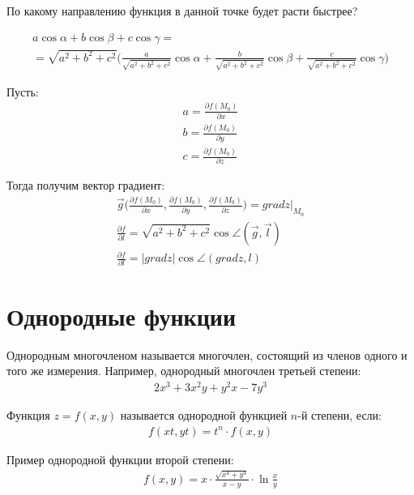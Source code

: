 \documentclass[a4paper,12pt,oneside]{extbook}
\theoremstyle{numbered}
\theoremstyle{unnumbered}
\theoremstyle{named}
\theoremstyle{unnumbered}
\theoremstyle{named}
\theoremstyle{named}
\theoremstyle{named}
\begin{document}
По какому направлению функция в данной точке будет расти быстрее?

\begin{gather*}
    a\cos{\alpha} + b\cos{\beta} + c\cos{\gamma} = \\
    = \sqrt{a^2 + b^2 + c^2} \Big( \frac{a}{\sqrt{a^2 + b^2 + c^2}} \cos{\alpha} + \frac{b}{\sqrt{a^2 + b^2 + c^2}} \cos{\beta} + \frac{c}{\sqrt{a^2 + b^2 + c^2}} \cos{\gamma} \Big)
\end{gather*}

Пусть:
\begin{gather*}
    a = \frac{\partial f(M_0)}{\partial x} \\
    b = \frac{\partial f(M_0)}{\partial y} \\
    c = \frac{\partial f(M_0)}{\partial z}
\end{gather*}

Тогда получим вектор градиент:
\begin{gather*}
    \overrightarrow{g} \Big( \frac{\partial f(M_0)}{\partial x}, \frac{\partial f(M_0)}{\partial y}, \frac{\partial f(M_0)}{\partial z} \Big) = grad z \Big|_{M_0} \\
    \frac{\partial f}{\partial l} = \sqrt{a^2 + b^2 + c^2} \cos{\angle(\overrightarrow{g}, \overrightarrow{l})} \\
    \frac{\partial f}{\partial l} = |grad z| \cos{\angle(grad z, l)}
\end{gather*}

\section{Однородные функции}%
\label{sec:Однородные функции}

\begin{siderules}
    Однородным многочленом называется многочлен, состоящий из членов одного и того же измерения. Например, однородный многочлен третьей степени:
    \begin{gather*}
        2x^3 + 3x^2y + y^2x - 7y^3
    \end{gather*}
\end{siderules}

\begin{siderules}
    Функция \(z = f(x, y)\) называется однородной функцией \(n\)-й степени, если:
    \begin{gather*}
        f(xt, yt) = t^n \cdot f(x, y)
    \end{gather*}

    Пример однородной функции второй степени:
    \begin{gather*}
        f(x, y) = x \cdot \frac{\sqrt{x^4 + y^4}}{x - y} \cdot \ln{\frac{x}{y}}
    \end{gather*}
\end{siderules}
\end{document}
